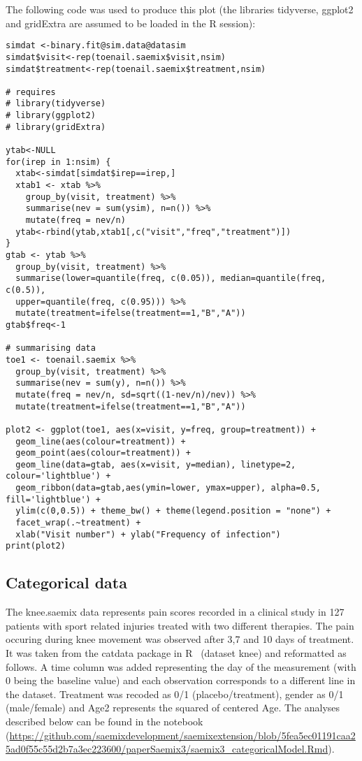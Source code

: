 The following code was used to produce this plot (the libraries {\sf tidyverse, ggplot2} and {\sf gridExtra} are assumed to be loaded in the {\sf R} session):
\begin{verbatim}
simdat <-binary.fit@sim.data@datasim
simdat$visit<-rep(toenail.saemix$visit,nsim)
simdat$treatment<-rep(toenail.saemix$treatment,nsim)
 
# requires 
# library(tidyverse)
# library(ggplot2)
# library(gridExtra)

ytab<-NULL
for(irep in 1:nsim) {
  xtab<-simdat[simdat$irep==irep,]
  xtab1 <- xtab %>%
    group_by(visit, treatment) %>%
    summarise(nev = sum(ysim), n=n()) %>%
    mutate(freq = nev/n)
  ytab<-rbind(ytab,xtab1[,c("visit","freq","treatment")])
}
gtab <- ytab %>%
  group_by(visit, treatment) %>%
  summarise(lower=quantile(freq, c(0.05)), median=quantile(freq, c(0.5)), 
  upper=quantile(freq, c(0.95))) %>%
  mutate(treatment=ifelse(treatment==1,"B","A"))
gtab$freq<-1

# summarising data
toe1 <- toenail.saemix %>%
  group_by(visit, treatment) %>%
  summarise(nev = sum(y), n=n()) %>%
  mutate(freq = nev/n, sd=sqrt((1-nev/n)/nev)) %>%
  mutate(treatment=ifelse(treatment==1,"B","A"))

plot2 <- ggplot(toe1, aes(x=visit, y=freq, group=treatment)) + 
  geom_line(aes(colour=treatment)) + 
  geom_point(aes(colour=treatment)) + 
  geom_line(data=gtab, aes(x=visit, y=median), linetype=2, colour='lightblue') + 
  geom_ribbon(data=gtab,aes(ymin=lower, ymax=upper), alpha=0.5, fill='lightblue') +
  ylim(c(0,0.5)) + theme_bw() + theme(legend.position = "none") + 
  facet_wrap(.~treatment) +
  xlab("Visit number") + ylab("Frequency of infection")
print(plot2)
\end{verbatim}


\subsection{Categorical data} \label{sec:kneeCat}

The {\sf knee.saemix} data represents pain scores recorded in a clinical study in 127 patients with sport related injuries treated with two different therapies. The pain occuring during knee movement was observed after 3,7 and 10 days of treatment. It was taken from the {\sf catdata} package in R~\cite{catdata} (dataset {\sf knee}) and reformatted as follows. A time column was added representing the day of the measurement (with 0 being the baseline value) and each observation corresponds to a different line in the dataset. Treatment was recoded as 0/1 (placebo/treatment), gender as 0/1 (male/female) and {\sf Age2} represents the squared of centered Age. The analyses described below can be found in the notebook (\url{https://github.com/saemixdevelopment/saemixextension/blob/5fea5ec01191caa25ad0f55c55d2b7a3ec223600/paperSaemix3/saemix3_categoricalModel.Rmd}).

